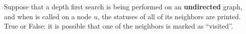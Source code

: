 \Needspace{1.5in}
\begin{prob}

    Suppose that a depth first search is being performed on an
    \textbf{undirected} graph, and when  is called on a node $u$,
    the statuses of all of its neighbors are printed. True or False:
    it is possible that one of the neighbors is marked as ``visited''.

    \tF{}

\end{prob}
